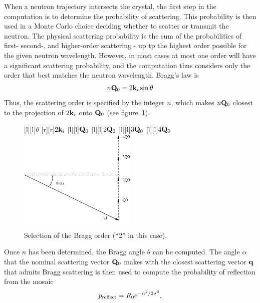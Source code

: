 When a neutron trajectory intersects the crystal, the first step in the
computation is to determine the probability of scattering. This
probability is then used in a Monte Carlo choice deciding whether to
scatter or transmit the neutron. The physical scattering probability is the sum
of the probabilities of first- second-, and higher-order scattering -
up tp the highest order possible for the given neutron wavelength. 
However, in most cases at most one order will have a
significant scattering probability, and the computation thus considers
only the order that best matches the neutron wavelength. Bragg's law is
\begin{equation}
n{\bf Q}_0 = 2{\bf k}_i\sin\theta 
\end{equation}
Thus, the scattering order is specified by the integer $n$, which makes
$n {\bf Q}_0$ closest to the projection of $2{\bf k}_i$ onto ${\bf Q}_0$ 
(see figure~\ref{f:mosaic_order}).
%
%
\begin{figure}
  \begin{center}
    [l][l]{$\theta$}
    [r][r]{$2{\bf k}_{\rm i}$}
    [l][l]{${\bf Q}_0$}
    [l][l]{$2{\bf Q}_0$}
    [l][l]{$3{\bf Q}_0$}
    [l][l]{$4{\bf Q}_0$}
    \includegraphics[width=0.5\textwidth]{figures/mosaic_order.eps}
  \end{center}
\caption{Selection of the Bragg order (``2'' in this case).}
\label{f:mosaic_order}
\end{figure}
%
Once $n$ has been determined, the Bragg angle $\theta$ can be
computed. The angle $\alpha$ that the nominal scattering vector ${\bf Q}_0$
makes with the closest scattering vector ${\bf q}$ that admits Bragg
scattering is then used to compute the probability of reflection from
the mosaic
\begin{equation} 
p_{\rm reflect} = R_0 e^{-\alpha^2/2\sigma^2},
\end{equation}

